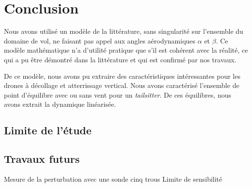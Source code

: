 \chapter*{Conclusion}
{ \color{red}

Nous avons utilisé un modèle de la littérature, sans singularité sur l'ensemble du domaine de vol, ne faisant pas appel aux angles aérodynamiques $\alpha$ et $\beta$. Ce modèle mathématique n'a d'utilité pratique que s'il est cohérent avec la réalité, ce qui a pu être démontré dans la littérature et qui est confirmé par nos travaux.

De ce modèle, nous avons pu extraire des caractéristiques intéressantes pour les drones à décollage et atterrissage vertical. 
Nous avons caractérisé l'ensemble de point d'équilibre avec ou sans vent pour un \textit{tailsitter}. De ces équilibres, nous avons extrait la dynamique linéarisée.



\section{Limite de l'étude}

\section{Travaux futurs}

Mesure de la perturbation avec une sonde cinq trous
Limite de sensibilité

}